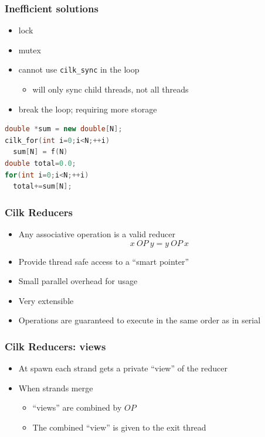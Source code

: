 \documentclass[fleqn,xcolor=table,10pt,final]{beamer}
\begin{document}
\begin{frame}[fragile]
  \frametitle{Inefficient solutions}
  \begin{itemize}
    \item lock
    \item mutex
  \end{itemize}
  \begin{itemize}
    \item cannot use {\tt cilk\_sync} in the loop
      \begin{itemize}
        \item will only sync child threads, not all threads
      \end{itemize}
  \end{itemize}
  \begin{itemize}
    \item break the loop; requiring more storage
  \end{itemize}
  \begin{lstlisting}[language=C++,basicstyle=\scriptsize]
double *sum = new double[N];
cilk_for(int i=0;i<N;++i)
  sum[N] = f(N)
double total=0.0;
for(int i=0;i<N;++i)
  total+=sum[N];
  \end{lstlisting}
\end{frame}

\begin{frame}
  \frametitle{Cilk Reducers}
  \begin{itemize}
    \item Any associative operation is a valid reducer
      \begin{equation}
        x\ OP\ y = y\ OP\ x
      \end{equation}
    \item Provide thread safe access to a ``smart pointer''
    \item Small parallel overhead for usage
    \item Very extensible
    \item Operations are guaranteed to execute in the same order as in serial
  \end{itemize}
\end{frame}

\begin{frame}
  \frametitle{Cilk Reducers: views}
  \begin{itemize}
    \item At spawn each strand gets a private ``view'' of the reducer
    \item When strands merge
      \begin{itemize}
        \item ``views'' are combined by $OP$
        \item The combined ``view'' is given to the exit thread
      \end{itemize}
  \end{itemize}
\end{frame}
\end{document}
